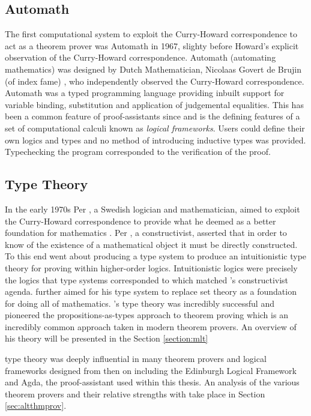 \subsection{Automath}
The first computational system to exploit the Curry-Howard correspondence to act as
a theorem prover was Automath in 1967, slighty before Howard's explicit
observation of the Curry-Howard correspondence. Automath (automating
mathematics) was designed by Dutch Mathematician, Nicolaas Govert de Brujin (of
index fame) \cite{de1983automath}, who independently observed the Curry-Howard correspondence.
Automath was a typed programming language providing inbuilt support for variable
binding, substitution and application of judgemental equalities. This has been
a common feature of proof-assistants since and is the defining features of
a set of computational calculi known as \textit{logical frameworks}. Users could
define their own logics and types and no method of introducing inductive types
was provided. Typechecking the program corresponded to the verification of the
proof.
\subsection{\mlt{} Type Theory}
In the early 1970s Per \mlt, a Swedish logician and mathematician, aimed
to exploit the Curry-Howard correspondence to provide what he deemed as a better
foundation for mathematics \cite{martin1984intuitionistic}. Per \mlt, a constructivist, asserted that in
order to know of the existence of a mathematical object it must be directly
constructed. To this end \mlt{} went about producing a type system to
produce an intuitionistic type theory for proving within higher-order logics.
Intuitionistic logics were precisely the logics that type systems corresponded
to which matched \mlt's constructivist agenda. \mlt{} further aimed
for his type system to replace set theory as a foundation for doing all of
mathematics. \mlt's type theory was incredibly successful and pioneered
the propositions-as-types approach to theorem proving which is an incredibly
common approach taken in modern theorem provers. An overview of his theory will
be presented in the Section \ref{section:mlt}

\mlt{} type theory was deeply influential in many theorem provers and
logical frameworks designed from then on including the Edinburgh Logical
Framework \cite{harper1993framework} and  Agda, the proof-assistant used within this thesis. An analysis of
the various theorem provers and their relative strengths with take place in
Section
\ref{sec:altthmprov}.

